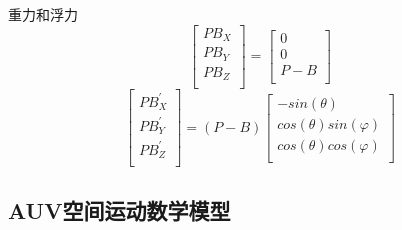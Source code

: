 \documentclass{ctexart}
\begin{document}
	重力和浮力
	\[
		\begin{bmatrix}
			PB_X\\
			PB_Y\\
			PB_Z\\
		\end{bmatrix}=
		\begin{bmatrix}
			0\\
			0\\
			P-B\\
		\end{bmatrix}
	\]
	\[
		\begin{bmatrix}
			PB_X^{'}\\
			PB_Y^{'}\\
			PB_Z^{'}\\
		\end{bmatrix}=(P-B)
		\begin{bmatrix}
			-sin(\theta)\\
			cos(\theta)sin(\varphi)\\
			cos(\theta)cos(\varphi)\\
		\end{bmatrix}
	\]
	
	\subsection{AUV空间运动数学模型}
\end{document}

